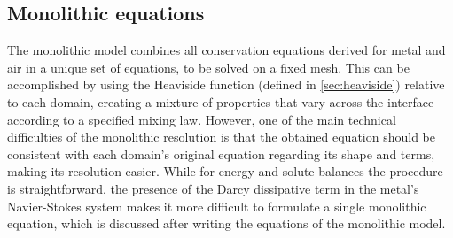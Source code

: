 \subsection{Monolithic equations}
%
The monolithic model combines all conservation equations derived for metal and air in a unique set of equations, to be solved on a fixed mesh. 
This can be accomplished by using the Heaviside function (defined in \cref{sec:heaviside}) relative to each domain, creating a mixture of properties that
vary across the interface according to a specified mixing law. However, one of the main technical difficulties of the monolithic resolution is that the
obtained equation should be consistent with each domain's original equation regarding its shape and terms, making its resolution easier. 
While for energy and solute balances the procedure is straightforward, the presence of the 
Darcy dissipative term in the metal's Navier-Stokes system makes it more difficult to formulate a single monolithic equation, which is discussed
after writing the equations of the monolithic model.
%
